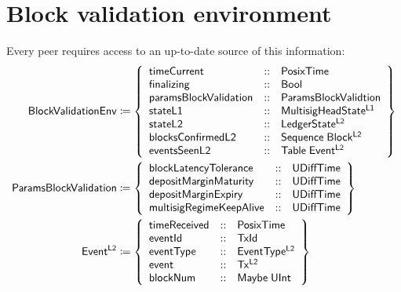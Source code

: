 \documentclass[../hydrozoa.tex]{subfiles}
\begin{document}
\section{Block validation environment}%
\label{h:l2-block-validation-environment}%

Every peer requires access to an up-to-date source of this information:
\begin{equation*}
\begin{split}
  \mathsf{BlockValidationEnv} &\coloneq \left\{
    \begin{array}{lll}
      \mathsf{timeCurrent} &::& \mathsf{PosixTime} \\
      \mathsf{finalizing} &::& \mathsf{Bool} \\
      \mathsf{paramsBlockValidation} &::& \mathsf{ParamsBlockValidtion} \\
      \mathsf{stateL1} &::& \mathsf{MultisigHeadState^{L1}} \\
      \mathsf{stateL2} &::& \mathsf{LedgerState^{L2}} \\
      \mathsf{blocksConfirmedL2} &::& \mathsf{Sequence} \; \mathsf{Block^{L2}} \\
      \mathsf{eventsSeenL2} &::& \mathsf{Table} \; \mathsf{Event^{L2}}
    \end{array}\right\} \\
  \mathsf{ParamsBlockValidation} &\coloneq \left\{
    \begin{array}{lll}
      \mathsf{blockLatencyTolerance} &::& \mathsf{UDiffTime} \\
      \mathsf{depositMarginMaturity} &::& \mathsf{UDiffTime} \\
      \mathsf{depositMarginExpiry} &::& \mathsf{UDiffTime} \\
      \mathsf{multisigRegimeKeepAlive} &::& \mathsf{UDiffTime}
    \end{array}\right\} \\
  \mathsf{Event^{L2}} &\coloneq \left\{
    \begin{array}{lll}
      \mathsf{timeReceived} &::& \mathsf{PosixTime} \\
      \mathsf{eventId} &::& \mathsf{TxId} \\
      \mathsf{eventType} &::& \mathsf{EventType^{L2}} \\
      \mathsf{event} &::& \mathsf{Tx^{L2}} \\
      \mathsf{blockNum} &::& \mathsf{Maybe} \; \mathsf{UInt}
    \end{array}\right\} \\
\end{split}
\end{equation*}
\end{document}
